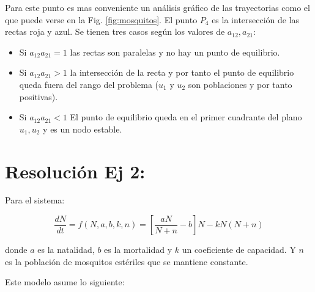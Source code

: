 \documentclass[twocolumn,aps,prl]{revtex4-1}
\begin{document}

Para este punto es mas conveniente un análisis gráfico de las trayectorias como el que puede verse en la Fig. \ref{fig:mosquitos}. El punto $P_4$ es la intersección de las rectas roja y azul. Se tienen tres casos según los valores de $a_{12}, a_{21}$:

\begin{itemize}
    \item Si $a_{12} a_{21} = 1$ las rectas son paralelas y no hay un punto de equilibrio. 
    \item Si $a_{12} a_{21} > 1$ la intersección de la recta y por tanto el punto de equilibrio queda fuera del rango del problema ($u_1$ y $u_2$ son poblaciones y por tanto positivas). 
    \item Si $a_{12} a_{21} < 1$ El punto de equilibrio queda en el primer cuadrante del plano $u_1, u_2$ y es un nodo estable.
\end{itemize}


% 

\section{Resolución Ej 2:}

Para el sistema:

\begin{equation}\label{eq:esteril1}
    \frac{d N}{d t} = f(N,a,b,k,n) 
    = \left[\frac{a N}{N+n}-b\right] N- k N(N+n)
\end{equation}

donde $a$ es la natalidad, $b$ es la mortalidad y $k$ un coeficiente de capacidad. Y $n$ es la población de mosquitos estériles que se mantiene constante.

Este modelo asume lo siguiente:

\end{document}
